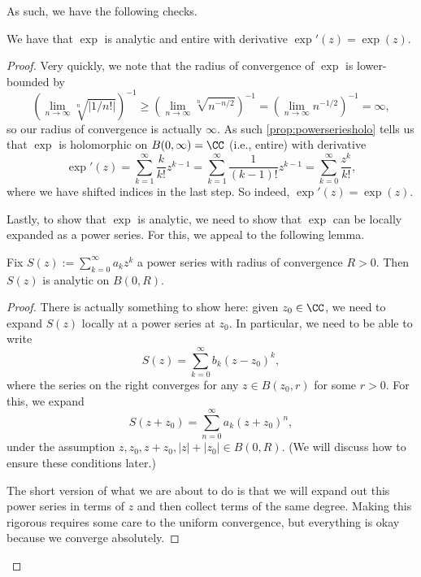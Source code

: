 As such, we have the following checks.
\begin{lemma} \label{lem:expanalytic}
	We have that $\exp$ is analytic and entire with derivative $\exp'(z)=\exp(z)$.
\end{lemma}
\begin{proof}
	Very quickly, we note that the radius of convergence of $\exp$ is lower-bounded by
	\[\left(\lim_{n\to\infty}\sqrt[n]{|1/n!|}\right)^{-1}\ge\left(\lim_{n\to\infty}\sqrt[n]{n^{-n/2}}\right)^{-1}=\left(\lim_{n\to\infty}n^{-1/2}\right)^{-1}=\infty,\]
	so our radius of convergence is actually $\infty$. As such \autoref{prop:powerseriesholo} tells us that $\exp$ is holomorphic on $B(0,\infty)=\CC$ (i.e., entire) with derivative
	\[\exp'(z)=\sum_{k=1}^\infty\frac k{k!}z^{k-1}=\sum_{k=1}^\infty\frac1{(k-1)!}z^{k-1}=\sum_{k=0}^\infty\frac{z^k}{k!},\]
	where we have shifted indices in the last step. So indeed, $\exp'(z)=\exp(z)$.

	Lastly, to show that $\exp$ is analytic, we need to show that $\exp$ can be locally expanded as a power series. For this, we appeal to the following lemma.
	\begin{lemma}
		Fix $S(z):=\sum_{k=0}^\infty a_kz^k$ a power series with radius of convergence $R>0$. Then $S(z)$ is analytic on $B(0,R)$.
	\end{lemma}
	\begin{proof}
		There is actually something to show here: given $z_0\in\CC$, we need to expand $S(z)$ locally at a power series at $z_0$. In particular, we need to be able to write
		\[S(z)=\sum_{k=0}^\infty b_k(z-z_0)^k,\]
		where the series on the right converges for any $z\in B(z_0,r)$ for some $r>0$. For this, we expand
		\[S(z+z_0)=\sum_{n=0}^\infty a_k(z+z_0)^n,\]
		under the assumption $z,z_0,z+z_0,|z|+|z_0|\in B(0,R)$. (We will discuss how to ensure these conditions later.)
		
		The short version of what we are about to do is that we will expand out this power series in terms of $z$ and then collect terms of the same degree. Making this rigorous requires some care to the uniform convergence, but everything is okay because we converge absolutely.
	

\end{proof}
\end{proof}
